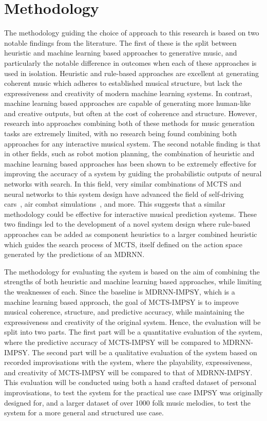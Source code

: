 \section{Methodology}
The methodology guiding the choice of approach to this research is based on two notable findings from the literature. The first of these is the split between heuristic and machine learning based approaches to generative music, and particularly the notable difference in outcomes when each of these approaches is used in isolation. Heuristic and rule-based approaches are excellent at generating coherent music which adheres to established musical structure, but lack the expressiveness and creativity of modern machine learning systems. In contrast, machine learning based approaches are capable of generating more human-like and creative outputs, but often at the cost of coherence and structure. However, research into approaches combining both of these methods for music generation tasks are extremely limited, with no research being found combining both approaches for any interactive musical system. The second notable finding is that in other fields, such as robot motion planning, the combination of heuristic and machine learning based approaches has been shown to be extremely effective for improving the accuracy of a system by guiding the probabilistic outputs of neural networks with search. In this field, very similar combinations of MCTS and neural networks to this system design have advanced the field of self-driving cars~\citep{Lei2021KBTree}, air combat simulations~\citep{Zhang2022AirCombat}, and more. This suggests that a similar methodology could be effective for interactive musical prediction systems. These two findings led to the development of a novel system design where rule-based approaches can be added as component heuristics to a larger combined heuristic which guides the search process of MCTS, itself defined on the action space generated by the predictions of an MDRNN.

The methodology for evaluating the system is based on the aim of combining the strengths of both heuristic and machine learning based approaches, while limiting the weaknesses of each. Since the baseline is MDRNN-IMPSY, which is a machine learning based approach, the goal of MCTS-IMPSY is to improve musical coherence, structure, and predictive accuracy, while maintaining the expressiveness and creativity of the original system. Hence, the evaluation will be split into two parts. The first part will be a quantitative evaluation of the system, where the predictive accuracy of MCTS-IMPSY will be compared to MDRNN-IMPSY. The second part will be a qualitative evaluation of the system based on recorded improvisations with the system, where the playability, expressiveness, and creativity of MCTS-IMPSY will be compared to that of MDRNN-IMPSY. This evaluation will be conducted using both a hand crafted dataset of personal improvisations, to test the system for the practical use case IMPSY was originally designed for, and a larger dataset of over 1000 folk music melodies, to test the system for a more general and structured use case.

